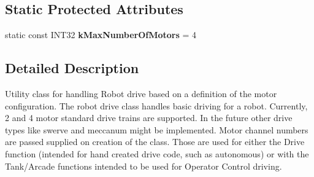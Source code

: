 \subsection*{\-Static \-Protected \-Attributes}
\begin{DoxyCompactItemize}
\item 
\hypertarget{classRobotDrive_a7c33f1e29f943ef3d8a81b2550f2bc7b}{static const \-I\-N\-T32 {\bfseries k\-Max\-Number\-Of\-Motors} = 4}\label{classRobotDrive_a7c33f1e29f943ef3d8a81b2550f2bc7b}

\end{DoxyCompactItemize}


\subsection{\-Detailed \-Description}
\-Utility class for handling \-Robot drive based on a definition of the motor configuration. \-The robot drive class handles basic driving for a robot. \-Currently, 2 and 4 motor standard drive trains are supported. \-In the future other drive types like swerve and meccanum might be implemented. \-Motor channel numbers are passed supplied on creation of the class. \-Those are used for either the \-Drive function (intended for hand created drive code, such as autonomous) or with the \-Tank/\-Arcade functions intended to be used for \-Operator \-Control driving. 

